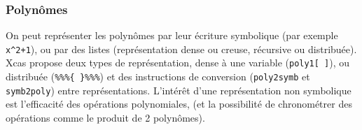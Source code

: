 \documentclass[a4paper,11pt]{article}
\begin{document}
\begin{giacjshere}
\subsubsection{Polyn\^omes}
On peut repr\'esenter les polyn\^omes par leur \'ecriture symbolique
(par exemple \verb|x^2+1|), ou par des listes (repr\'esentation dense
ou creuse, r\'ecursive ou distribu\'ee). 
Xcas propose deux types
de repr\'esentation, dense \`a une variable (\verb|poly1[ ]|), ou
distribu\'ee (\verb|%%%{ }%%%|) et des instructions de conversion
(\verb|poly2symb| et \verb|symb2poly|) entre repr\'esentations.
L'int\'er\^et d'une repr\'esentation
non symbolique est l'efficacit\'e des op\'erations polynomiales, (et la
possibilit\'e de chronom\'etrer des op\'erations comme le produit
de 2 polyn\^omes).


\end{giacjshere}
\end{document}
